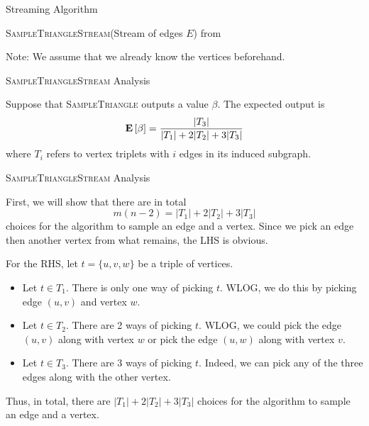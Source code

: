 \begin{frame}{Streaming Algorithm}
  \begin{algorithm}[H]
  \caption{\textsc{SampleTriangleStream}(Stream of edges \(E\))
  from \cite{Buriol_Frahling_Leonardi_Marchetti-Spaccamela_Sohler_2006}}
  \begin{algorithmic}
      \EndIf
    \EndFor
  \end{algorithmic}
  \end{algorithm}

  Note: We assume that we already know the vertices beforehand.
\end{frame}

\begin{frame}{\textsc{SampleTriangleStream} Analysis}
  \begin{lemma}
    Suppose that \textsc{SampleTriangle} outputs a value \(\beta\). The expected
    output is
    \[ \mathbf{E}\left[\beta\right] = \frac{|T_3|}{|T_1| + 2|T_2| + 3|T_3|} \]
    where \(T_i\) refers to vertex triplets with \(i\) edges in its induced
    subgraph.
  \end{lemma}
\end{frame}

\begin{frame}{\textsc{SampleTriangleStream} Analysis}
  \begin{proofs}
    First, we will show that there are in total
    \[ m(n-2) = |T_1| + 2|T_2| + 3|T_3| \]
    choices for the algorithm to sample an edge and a vertex. Since we pick an edge
    then another vertex from what remains, the LHS is obvious.

    For the RHS, let \(t = \{u, v, w\}\)
    be a triple of vertices.
    \begin{itemize}
      \item Let \(t \in T_1\). There is only one way of picking \(t\). WLOG, we
        do this by picking edge \((u, v)\) and vertex \(w\).
      \item Let \(t \in T_2\). There are 2 ways of picking \(t\). WLOG, we could pick
        the edge \((u, v)\) along with vertex \(w\) or pick the edge \((u, w)\)
        along with vertex \(v\).
      \item Let \(t \in T_3\). There are 3 ways of picking \(t\). Indeed, we can
        pick any of the three edges along with the other vertex.
    \end{itemize}
    Thus, in total, there are \(|T_1| + 2|T_2| + 3|T_3|\) choices for the
    algorithm to sample an edge and a vertex.
  \end{proofs}
\end{frame}

